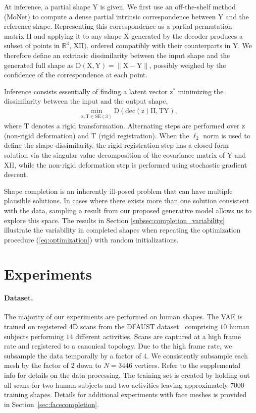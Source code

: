 \documentclass[10pt,twocolumn,letterpaper]{article}
\newcommand{\bb}[1]{\bm{\mathrm{#1}}}
\begin{document}
At inference, a partial shape $\bb{Y}$ is given. We first use an off-the-shelf method (MoNet) \cite{monet} to compute a dense  partial intrinsic correspondence between $\bb{Y}$ and the reference shape. Representing this correspondence as a partial permutation matrix $\bb{\Pi}$ and applying it to any shape $\bb{X}$ generated by the decoder produces a subset of points in $\mathbb{R}^3$, $\bb{X} \bb{\Pi} )$, ordered compatibly with their counterparts in $\bb{Y}$. 
We therefore define an extrinsic dissimilarity between the input shape and the generated full shape as
$\mathrm{D}(\bb{X},\bb{Y}) =  \| \bb{X} - \bb{Y} \|$, possibly weighed by the confidence of the correspondence at each point. 

Inference consists essentially of finding a latent vector $\bb{z}^\ast$ minimizing the dissimilarity between the input and the output shape,
\begin{eqnarray}
\min_{\bb{z}, \bb{T} \in \mathrm{SE}(3)} \mathrm{D}(\mathrm{dec}(\bb{z}) \bb{\Pi}, \bb{T} \bb{Y} ),
\label{eq:optimization}
\end{eqnarray}
where $\bb{T}$ denotes a rigid transformation. Alternating steps are performed over $\bb{z}$ (non-rigid deformation) and $\bb{T}$ (rigid registration). When the $\ell_2$ norm is used to define the shape dissimilarity, the rigid registration step has a closed-form solution via the singular value decomposition of the covariance matrix of $\bb{Y}$ and $\bb{X}\bb{\Pi}$, while the non-rigid deformation step is performed using stochastic gradient descent.

Shape completion is an inherently ill-posed problem that can have multiple plausible solutions. In cases where there exists more than one solution consistent with the data, sampling a result from our proposed generative model allows us to explore this space. The results in Section \ref{subsec:completion_variability} illustrate the variability in completed shapes when repeating the optimization procedure (\ref{eq:optimization}) with random initializations.

\section{Experiments}\paragraph{Dataset.} 
The majority of our experiments are performed on human shapes. The VAE is trained on registered 4D scans from the DFAUST dataset~\cite{dfaust:CVPR:2017} comprising $10$ human subjects performing $14$ different activities. Scans are captured at a high frame rate and registered to a canonical topology. Due to the high frame rate, we subsample the data temporally by a factor of $4$. We consistently subsample each mesh by the factor of $2$ down to $N=3446$ vertices. Refer to the supplemental info for details on the data processing. The training set is created by holding out all scans for two human subjects and two activities leaving approximately $7000$ training shapes. Details for additional experiments with face meshes is provided in Section~\ref{sec:facecompletion}.
\end{document}
